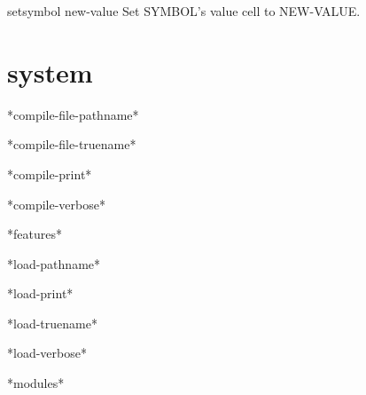 \begin{function}{set}{symbol new-value}{}
  Set SYMBOL's value cell to NEW-VALUE.
\end{function}

\section{system}

\begin{variable}{*compile-file-pathname*}{}{}
  
\end{variable}

\begin{variable}{*compile-file-truename*}{}{}
  
\end{variable}

\begin{variable}{*compile-print*}{}{}
  
\end{variable}

\begin{variable}{*compile-verbose*}{}{}
  
\end{variable}

\begin{variable}{*features*}{}{}
  
\end{variable}

\begin{variable}{*load-pathname*}{}{}
  
\end{variable}

\begin{variable}{*load-print*}{}{}
  
\end{variable}

\begin{variable}{*load-truename*}{}{}
  
\end{variable}

\begin{variable}{*load-verbose*}{}{}
  
\end{variable}

\begin{variable}{*modules*}{}{}
  
\end{variable}

